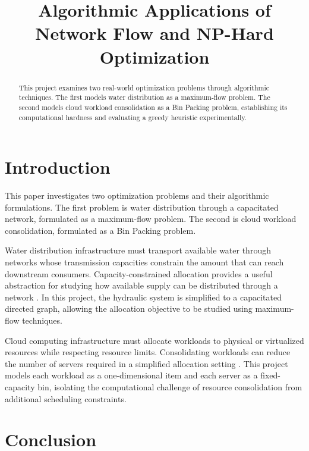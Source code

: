 \documentclass[conference]{IEEEtran}
\title{Algorithmic Applications of Network Flow and NP-Hard Optimization}
\author{
\IEEEauthorblockN{Pradhyuman Singh Shekahwat}
\IEEEauthorblockA{COT5405 -- Project 2}
}
\begin{document}
\maketitle

\begin{abstract}
This project examines two real-world optimization problems through
algorithmic techniques. The first models water distribution as a
maximum-flow problem. The second models cloud workload consolidation
as a Bin Packing problem, establishing its computational hardness and
evaluating a greedy heuristic experimentally.
\end{abstract}

\section{Introduction}

This paper investigates two optimization problems and their
algorithmic formulations. The first problem is water distribution
through a capacitated network, formulated as a maximum-flow problem.
The second is cloud workload consolidation, formulated as a Bin
Packing problem.

Water distribution infrastructure must transport available
water through networks whose transmission capacities
constrain the amount that can reach downstream consumers.
Capacity-constrained allocation provides a useful abstraction
for studying how available supply can be distributed through
a network \cite{epa_distribution}. In this project, the hydraulic system is simplified
to a capacitated directed graph, allowing the allocation
objective to be studied using maximum-flow techniques.

Cloud computing infrastructure must allocate workloads
to physical or virtualized resources while respecting
resource limits. Consolidating workloads can reduce the
number of servers required in a simplified allocation
setting \cite{kubernetes_resources}. This project models each workload as a one-dimensional
item and each server as a fixed-capacity bin, isolating the
computational challenge of resource consolidation from
additional scheduling constraints.







\section{Conclusion}
\end{document}
